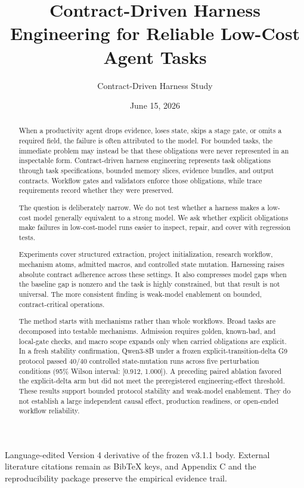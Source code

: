 \documentclass[11pt]{article}
\title{Contract-Driven Harness Engineering for Reliable Low-Cost Agent Tasks}
\author{Contract-Driven Harness Study}
\date{June 15, 2026}
\begin{document}
\maketitle

Language-edited Version 4 derivative of the frozen v3.1.1 body. External literature citations remain as BibTeX keys, and Appendix C and the reproducibility package preserve the empirical evidence trail.

\begin{abstract}

When a productivity agent drops evidence, loses state, skips a stage gate, or omits a required field, the failure is often attributed to the model. For bounded tasks, the immediate problem may instead be that these obligations were never represented in an inspectable form. Contract-driven harness engineering represents task obligations through task specifications, bounded memory slices, evidence bundles, and output contracts. Workflow gates and validators enforce those obligations, while trace requirements record whether they were preserved.

The question is deliberately narrow. We do not test whether a harness makes a low-cost model generally equivalent to a strong model. We ask whether explicit obligations make failures in low-cost-model runs easier to inspect, repair, and cover with regression tests.

Experiments cover structured extraction, project initialization, research workflow, mechanism atoms, admitted macros, and controlled state mutation. Harnessing raises absolute contract adherence across these settings. It also compresses model gaps when the baseline gap is nonzero and the task is highly constrained, but that result is not universal. The more consistent finding is weak-model enablement on bounded, contract-critical operations.

The method starts with mechanisms rather than whole workflows. Broad tasks are decomposed into testable mechanisms. Admission requires golden, known-bad, and local-gate checks, and macro scope expands only when carried obligations are explicit. In a fresh stability confirmation, Qwen3-8B under a frozen explicit-transition-delta G9 protocol passed 40/40 controlled state-mutation runs across five perturbation conditions (95\% Wilson interval: [0.912, 1.000]). A preceding paired ablation favored the explicit-delta arm but did not meet the preregistered engineering-effect threshold. These results support bounded protocol stability and weak-model enablement. They do not establish a large independent causal effect, production readiness, or open-ended workflow reliability.

\end{abstract}
\end{document}
